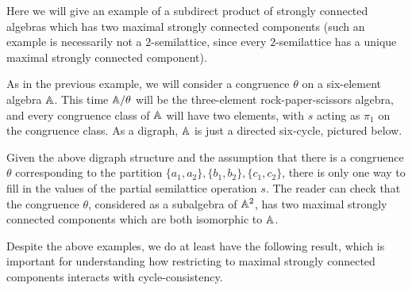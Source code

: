 \documentclass[letterpaper,11pt]{article}
\begin{document}
\begin{ex} Here we will give an example of a subdirect product of strongly connected algebras which has two maximal strongly connected components (such an example is necessarily not a $2$-semilattice, since every $2$-semilattice has a unique maximal strongly connected component).

As in the previous example, we will consider a congruence $\theta$ on a six-element algebra $\mathbb{A}$. This time $\mathbb{A}/\theta$ will be the three-element rock-paper-scissors algebra, and every congruence class of $\mathbb{A}$ will have two elements, with $s$ acting as $\pi_1$ on the congruence class. As a digraph, $\mathbb{A}$ is just a directed six-cycle, pictured below.
\begin{center}
\end{center}
Given the above digraph structure and the assumption that there is a congruence $\theta$ corresponding to the partition $\{a_1,a_2\},\{b_1,b_2\},\{c_1,c_2\}$, there is only one way to fill in the values of the partial semilattice operation $s$. The reader can check that the congruence $\theta$, considered as a subalgebra of $\mathbb{A}^2$, has two maximal strongly connected components which are both isomorphic to $\mathbb{A}$.
\end{ex}

Despite the above examples, we do at least have the following result, which is important for understanding how restricting to maximal strongly connected components interacts with cycle-consistency.
\end{document}
